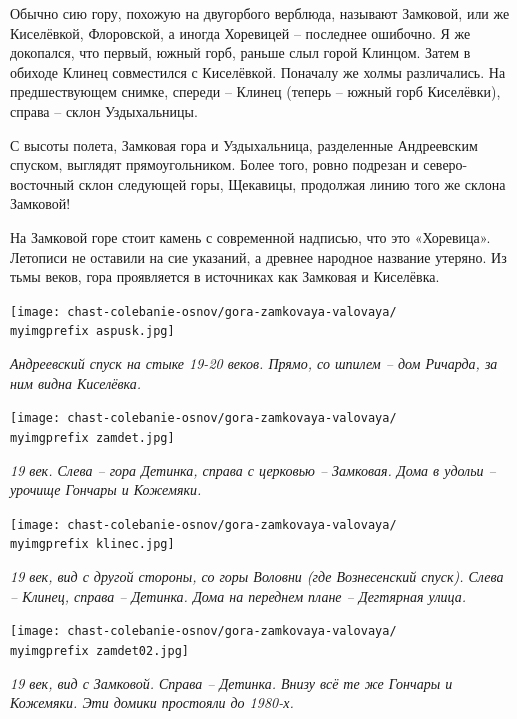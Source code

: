 Обычно сию гору, похожую на двугорбого верблюда, называют Замковой, или же Киселёвкой, Флоровской, а иногда Хоревицей – последнее ошибочно. Я же докопался, что первый, южный горб, раньше слыл горой Клинцом. Затем в обиходе Клинец совместился с Киселёвкой. Поначалу же холмы различались. На предшествующем снимке, спереди – Клинец (теперь – южный горб Киселёвки), справа – склон Уздыхальницы.

С высоты полета, Замковая гора и Уздыхальница, разделенные Андреевским спуском, выглядят прямоугольником. Более того, ровно подрезан и северо-восточный склон следующей горы, Щекавицы, продолжая линию того же склона Замковой!

На Замковой горе стоит камень с современной надписью, что это «Хоревица». Летописи не оставили на сие указаний, а древнее народное название утеряно. Из тьмы веков, гора проявляется в источниках как Замковая и Киселёвка.

\newpage
\vspace*{\fill}
\begin{center}
\texttt{[image: chast-colebanie-osnov/gora-zamkovaya-valovaya/\\myimgprefix aspusk.jpg]}

\textit{Андреевский спуск на стыке 19-20 веков. Прямо, со шпилем – дом Ричарда, за ним видна Киселёвка.}
\end{center}

\begin{center}
\texttt{[image: chast-colebanie-osnov/gora-zamkovaya-valovaya/\\myimgprefix zamdet.jpg]}

\textit{19 век. Слева – гора Детинка, справа с церковью – Замковая. Дома в удольи – урочище Гончары и Кожемяки.}
\end{center}
\vspace*{\fill}
\newpage

\vspace*{\fill}
\begin{center}
\texttt{[image: chast-colebanie-osnov/gora-zamkovaya-valovaya/\\myimgprefix klinec.jpg]}

\textit{19 век, вид с другой стороны, со горы Воловни (где Вознесенский спуск). Слева – Клинец, справа – Детинка. Дома на переднем плане – Дегтярная улица.}
\end{center}

\begin{center}
\texttt{[image: chast-colebanie-osnov/gora-zamkovaya-valovaya/\\myimgprefix zamdet02.jpg]}

\textit{19 век, вид с Замковой. Справа – Детинка. Внизу всё те же Гончары и Кожемяки. Эти домики простояли до 1980-х.}
\end{center}
\vspace*{\fill}
\newpage

